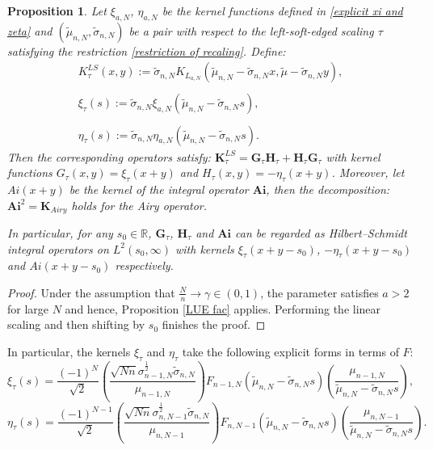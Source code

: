 \documentclass[11pt]{article}
\newtheorem{proposition}[theorem]{Proposition}
\numberwithin{equation}{section}%
\numberwithin{theorem}{section}
\begin{document}
\begin{proposition}\label{LUE left soft fac}
    Let $\xi_{a,N}$, $\eta_{a,N}$ be the kernel functions defined in \eqref{explicit xi and zeta} and $(\tilde{\mu}_{n,N},\tilde{\sigma}_{n,N})$ be a pair with respect to the left-soft-edged scaling $\tau$ satisfying the restriction \eqref{restriction of recaling}. Define:
    \begin{equation}\label{left soft kernel}
    \begin{array}{cc}
          K^{LS}_{\tau}(x,y):=\tilde\sigma_{n,N}K_{L_{a,N}}\left(\tilde{\mu}_{n,N}-\tilde\sigma_{n,N}x,\tilde\mu-\tilde\sigma_{n,N}y\right),\\
          \\
        \xi_{\tau}(s):=\tilde\sigma_{n,N}\xi_{{a,N}}\left(\tilde{\mu}_{n,N}-\tilde\sigma_{n,N}s\right),\\
        \\
          \eta_{\tau}(s):=\tilde\sigma_{n,N}\eta_{{a,N}}\left(\tilde{\mu}_{n,N}-\tilde\sigma_{n,N}s\right).
    \end{array}
    \end{equation}
    Then the corresponding operators satisfy: $\mathbf{K}_{\tau}^{LS}=\mathbf{G}_\tau\mathbf{H}_\tau+\mathbf{H}_\tau\mathbf{G}_\tau$ with kernel functions $G_{\tau}(x,y)=\xi_\tau(x+y)$ and $H_\tau(x,y)=-\eta_\tau(x+y)$. Moreover, let $Ai(x+y)$ be the kernel of the integral operator $\mathbf{Ai}$, then the decomposition: $\mathbf{Ai}^2=\mathbf{K}_{Airy}$ holds for the Airy operator.
    
    In particular, for any $s_0\in\mathbb{R}$, $\mathbf{G}_{\tau}$, $\mathbf{H}_\tau$ and $\mathbf{Ai}$ can be regarded as Hilbert--Schmidt integral operators on $L^2(s_0,\infty)$ with kernels $\xi_\tau(x+y-s_0)$, $-\eta_\tau(x+y-s_0)$ and $Ai(x+y-s_0)$ respectively.
\end{proposition}
\begin{proof}
   Under the assumption that $\frac{N}{n}\rightarrow\gamma\in(0,1)$, the parameter satisfies $a>2$ for large $N$ and hence, Proposition \ref{LUE fac} applies. Performing the linear scaling and then shifting by $s_0$ finishes the proof.
\end{proof}

In particular, the kernels $\xi_\tau$ and $\eta_\tau$ take the following explicit forms in terms of $F$:
\begin{equation*}
    \xi_{\tau}(s)=\frac{(-1)^N}{\sqrt2}\left(\frac{\sqrt{Nn}\sigma_{n-1,N}^\frac{1}{2}\tilde{\sigma}_{n,N}}{\mu_{n-1,N}}\right)F_{n-1,N}\left(\tilde{\mu}_{n,N}-\tilde{\sigma}_{n,N}s\right)\left(\frac{\mu_{n-1,N}}{\tilde{\mu}_{n,N}-\tilde{\sigma}_{n,N}s}\right),
\end{equation*}
\begin{equation*}
    \eta_{\tau}(s)=\frac{(-1)^{N-1}}{\sqrt2}\left(\frac{\sqrt{Nn}\sigma_{n,N-1}^\frac{1}{2}\tilde{\sigma}_{n,N}}{\mu_{n,N-1}}\right)F_{n,N-1}\left(\tilde{\mu}_{n,N}-\tilde{\sigma}_{n,N}s\right)\left(\frac{\mu_{n,N-1}}{\tilde{\mu}_{n,N}-\tilde{\sigma}_{n,N}s}\right).
\end{equation*}
\end{document}
